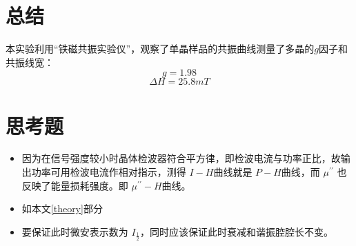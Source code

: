 \documentclass{buaaemp}
\begin{document}
	\section{总结}
	本实验利用“铁磁共振实验仪”，观察了单晶样品的共振曲线测量了多晶的$g$因子和共振线宽：
	$$g=1.98 $$
        $$\Delta H=25.8 mT$$
	
	\section{思考题}
	\begin{itemize}
	    \item 因为在信号强度较小时晶体检波器符合平方律，即检波电流与功率正比，故输出功率可用检波电流作相对指示，测得 $I-H$曲线就是 $P-H$曲线，而 $\mu^{\prime\prime} $ 也反映了能量损耗强度。即 $\mu^{\prime\prime} -H$曲线。 
            \item 如本文\ref{theory}部分
            \item 要保证此时微安表示数为 $I_{\frac{1}{2}}$，同时应该保证此时衰减和谐振腔腔长不变。
	\end{itemize}



\renewcommand\refname{\heiti\wuhao\centerline{参考文献}\global\def\refname{参考文献}}
\vskip 12pt

\let\OLDthebibliography\thebibliography
\renewcommand\thebibliography[1]{
  \OLDthebibliography{#1}
  \setlength{\parskip}{0pt}
  \setlength{\itemsep}{0pt plus 0.3ex}
}

{
\renewcommand{\baselinestretch}{0.9}
\liuhao


}
\end{document}
